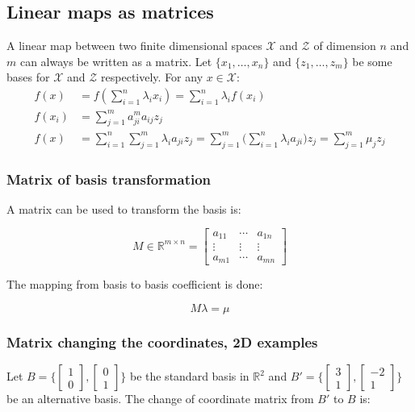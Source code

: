 	\subsection{Linear maps as matrices}
	A linear map between two finite dimensional spaces $\mathcal{X}$ and $\mathcal{Z}$ of dimension $n$ and $m$ can always be written as a matrix.
	Let $\{x_1, \dots, x_n\}$ and $\{z_1, \dots, z_m\}$ be some bases for $\mathcal{X}$ and $\mathcal{Z}$ respectively.
	For any $x\in\mathcal{X}$:
	\begin{align*}
		f(x) &= f(\sum\limits_{i=1}^n\lambda_ix_i) = \sum\limits_{i = 1}^n\lambda_if(x_i)\\
		f(x_i) &= \sum\limits_{j=1}^ma_{ji}^ma_{ij}z_j\\
		f(x) &= \sum\limits_{i=1}^n\sum\limits_{j=1}^m\lambda_ia_{ji}z_j = \sum\limits_{j=1}^m\bigl(\sum\limits_{i=1}^n\lambda_ia_{ji}\bigr)z_j = \sum\limits_{j=1}^m\mu_j z_j
	\end{align*}

		\subsubsection{Matrix of basis transformation}
		A matrix can be used to transform the basis is:

		$$M\in\mathbb{R}^{m\times n} = \begin{bmatrix} a_{11} & \cdots & a_{1n} \\ \vdots & \vdots & \vdots \\ a_{m1} & \cdots & a_{mn} \end{bmatrix}$$

		The mapping from basis to basis coefficient is done:

		$$M\lambda = \mu$$

		\subsubsection{Matrix changing the coordinates, 2D examples}
		Let $B = \biggl\{ \begin{bmatrix} 1 \\0 \end{bmatrix} , \begin{bmatrix} 0 \\ 1\end{bmatrix}\biggr\}$ be the standard basis in $\mathbb{R}^2$ and $B' = \biggl\{\begin{bmatrix} 3 \\ 1 \end{bmatrix}, \begin{bmatrix} -2 \\ 1 \end{bmatrix}\biggr\}$ be an alternative basis.
		The change of coordinate matrix from $B'$ to $B$ is: 

